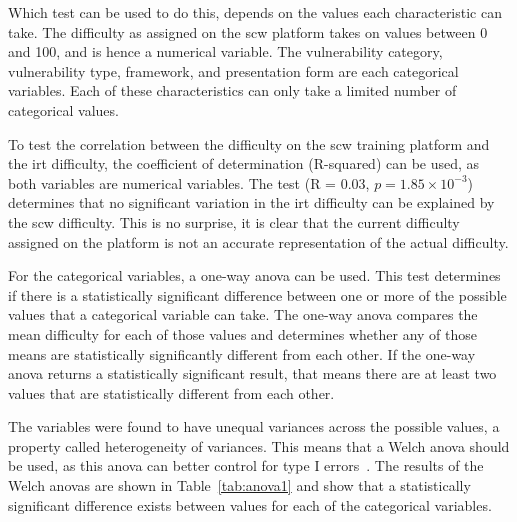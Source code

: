 Which test can be used to do this, depends on the values each characteristic can take.
The difficulty as assigned on the \gls{scw} platform takes on values between 0 and 100, and is hence a numerical variable.
The vulnerability category, vulnerability type, framework, and presentation form are each categorical variables.
Each of these characteristics can only take a limited number of categorical values.

To test the correlation between the difficulty on the \gls{scw} training platform and the \gls{irt} difficulty, the coefficient of determination (R-squared) can be used, as both variables are numerical variables.
The test (R = 0.03, $p = 1.85 \times 10^{-3}$) determines that no significant variation in the \gls{irt} difficulty can be explained by the \gls{scw} difficulty.
This is no surprise, it is clear that the current difficulty assigned on the platform is not an accurate representation of the actual difficulty.

For the categorical variables, a one-way \gls{anova} can be used.
This test determines if there is a statistically significant difference between one or more of the possible values that a categorical variable can take.
The one-way \gls{anova} compares the mean difficulty for each of those values and determines whether any of those means are statistically significantly different from each other.
If the one-way \gls{anova} returns a statistically significant result, that means there are at least two values that are statistically different from each other.

The variables were found to have unequal variances across the possible values, a property called heterogeneity of variances.
This means that a Welch \gls{anova} should be used, as this \gls{anova} can better control for type I errors~\cite{liu2015comparing}.
The results of the Welch \glspl{anova} are shown in Table~\ref{tab:anova1} and show that a statistically significant difference exists between values for each of the categorical variables.

